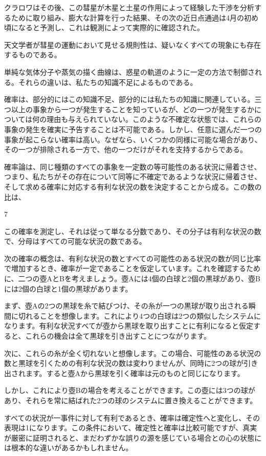 \documentclass[a4paper,11pt,openany]{ltjsbook}
\begin{document}
クラロワはその後、この彗星が木星と土星の作用によって経験した干渉を分析するために取り組み、膨大な計算を行った結果、その次の近日点通過は4月の初め頃になると予測し、これは観測によって実際的に確認された。

天文学者が彗星の運動において見せる規則性は、疑いなくすべての現象にも存在するものである。

単純な気体分子や蒸気の描く曲線は、惑星の軌道のように一定の方法で制御される。それらの違いは、私たちの知識不足によるものである。

確率は、部分的にはこの知識不足、部分的には私たちの知識に関連している。三つ以上の事象から一つが発生することを知っているが、どの一つが発生するかについては何の理由も与えられていない。このような不確定な状態では、これらの事象の発生を確実に予告することは不可能である。しかし、任意に選んだ一つの事象が起こらない確率は高い。なぜなら、いくつかの同様に可能な場合があり、その一つが排除される一方で、他の一つだけがそれを支持するからである。

確率論は、同じ種類のすべての事象を一定数の等可能性のある状況に帰着させ、つまり、私たちがその存在について同等に不確定であるような状況に帰着させ、そして求める確率に対応する有利な状況の数を決定することから成る。この数の比は、

7

この確率を測定し、それは従って単なる分数であり、その分子は有利な状況の数で、分母はすべての可能な状況の数である。

次の確率の概念は、有利な状況の数とすべての可能性のある状況の数が同じ比率で増加するとき、確率が一定であることを仮定しています。これを確認するために、二つの壺AとBを考えましょう。壺Aには4個の白球と2個の黒球があり、壺Bには2個の白球と1個の黒球があります。

まず、壺Aの2つの黒球を糸で結びつけ、その糸が一つの黒球が取り出される瞬間に切れることを想像します。これにより4つの白球は2つの類似したシステムになります。有利な状況すべてが壺から黒球を取り出すことに有利になると仮定すると、これらの機会は全て黒球を引き出すことにつながります。

次に、これらの糸が全く切れないと想像します。この場合、可能性のある状況の数と黒球を引くための有利な状況の数は変わりませんが、同時に2つの球が引き出されます。すると壺Aから黒球を引く確率は元のものと同じになります。

しかし、これにより壺Bの場合を考えることができます。この壺には3つの球があり、それらを常に結ばれた2つの球のシステムに置き換えることができます。

すべての状況が一事件に対して有利であるとき、確率は確定性へと変化し、その表現は1になります。この条件において、確定性と確率は比較可能ですが、真実が厳密に証明されると、まだわずかな誤りの源を感じている場合との心の状態には根本的な違いがあるかもしれません。
\end{document}
